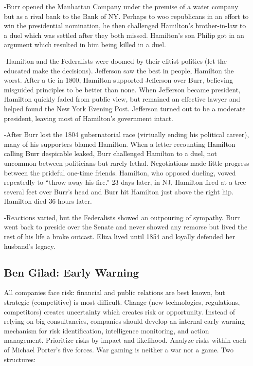 \documentclass[
]{article}
\begin{document}
-Burr opened the Manhattan Company under the premise of a water company
but as a rival bank to the Bank of NY. Perhaps to woo republicans in an
effort to win the presidential nomination, he then challenged Hamilton's
brother-in-law to a duel which was settled after they both missed.
Hamilton's son Philip got in an argument which resulted in him being
killed in a duel.

-Hamilton and the Federalists were doomed by their elitist politics (let
the educated make the decisions). Jefferson saw the best in people,
Hamilton the worst. After a tie in 1800, Hamilton supported Jefferson
over Burr, believing misguided principles to be better than none. When
Jefferson became president, Hamilton quickly faded from public view, but
remained an effective lawyer and helped found the New York Evening Post.
Jefferson turned out to be a moderate president, leaving most of
Hamilton's government intact.

-After Burr lost the 1804 gubernatorial race (virtually ending his
political career), many of his supporters blamed Hamilton. When a letter
recounting Hamilton calling Burr despicable leaked, Burr challenged
Hamilton to a duel, not uncommon between politicians but rarely lethal.
Negotiations made little progress between the prideful one-time friends.
Hamilton, who opposed dueling, vowed repeatedly to ``throw away his
fire.'' 23 days later, in NJ, Hamilton fired at a tree several feet over
Burr's head and Burr hit Hamilton just above the right hip. Hamilton
died 36 hours later.

-Reactions varied, but the Federalists showed an outpouring of sympathy.
Burr went back to preside over the Senate and never showed any remorse
but lived the rest of his life a broke outcast. Eliza lived until 1854
and loyally defended her husband's legacy.

\hypertarget{ben-gilad-early-warning}{%
\subsection{Ben Gilad: Early Warning}\label{ben-gilad-early-warning}}

All companies face risk: financial and public relations are best known,
but strategic (competitive) is most difficult. Change (new technologies,
regulations, competitors) creates uncertainty which creates risk or
opportunity. Instead of relying on big consultancies, companies should
develop an internal early warning mechanism for risk identification,
intelligence monitoring, and action management. Prioritize risks by
impact and likelihood. Analyze risks within each of Michael Porter's
five forces. War gaming is neither a war nor a game. Two structures:
\end{document}
